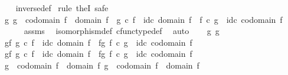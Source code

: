 \begin{isabellebody}
%
\isadelimproof
\ \ %
\endisadelimproof
%
\isatagproof
{}\isamarkupfalse%
\ inverse{\isacharunderscore}{\kern0pt}def\isanewline
{}\isamarkupfalse%
\ {\isacharparenleft}{\kern0pt}rule\ theI{\isacharprime}{\kern0pt}{\isacharcomma}{\kern0pt}\ safe{\isacharparenright}{\kern0pt}\isanewline
\ \ \isamarkupfalse%
\ {\isachardoublequoteopen}{\isasymexists}g{\isachardot}{\kern0pt}\ g\ {\isacharcolon}{\kern0pt}\ codomain\ f\ {\isasymrightarrow}\ domain\ f\ {\isasymand}\ g\ {\isasymcirc}\isactrlsub c\ f\ {\isacharequal}{\kern0pt}\ id\isactrlsub c\ {\isacharparenleft}{\kern0pt}domain\ f{\isacharparenright}{\kern0pt}\ {\isasymand}\ f\ {\isasymcirc}\isactrlsub c\ g\ {\isacharequal}{\kern0pt}\ id\isactrlsub c\ {\isacharparenleft}{\kern0pt}codomain\ f{\isacharparenright}{\kern0pt}{\isachardoublequoteclose}\isanewline
\ \ \ \ \isamarkupfalse%
\ assms\ \isamarkupfalse%
\ isomorphism{\isacharunderscore}{\kern0pt}def\ cfunc{\isacharunderscore}{\kern0pt}type{\isacharunderscore}{\kern0pt}def\ \isamarkupfalse%
\ auto\isanewline
{}\isamarkupfalse%
\isanewline
\ \ \isamarkupfalse%
\ g{}\ g{}\isanewline
\ \ \isamarkupfalse%
\ g{}{\isacharunderscore}{\kern0pt}f{\isacharcolon}{\kern0pt}\ {\isachardoublequoteopen}g{}\ {\isasymcirc}\isactrlsub c\ f\ {\isacharequal}{\kern0pt}\ id\isactrlsub c\ {\isacharparenleft}{\kern0pt}domain\ f{\isacharparenright}{\kern0pt}{\isachardoublequoteclose}\ \ f{\isacharunderscore}{\kern0pt}g{}{\isacharcolon}{\kern0pt}\ {\isachardoublequoteopen}f\ {\isasymcirc}\isactrlsub c\ g{}\ {\isacharequal}{\kern0pt}\ id\isactrlsub c\ {\isacharparenleft}{\kern0pt}codomain\ f{\isacharparenright}{\kern0pt}{\isachardoublequoteclose}\isanewline
\ \ \isamarkupfalse%
\ g{}{\isacharunderscore}{\kern0pt}f{\isacharcolon}{\kern0pt}\ {\isachardoublequoteopen}g{}\ {\isasymcirc}\isactrlsub c\ f\ {\isacharequal}{\kern0pt}\ id\isactrlsub c\ {\isacharparenleft}{\kern0pt}domain\ f{\isacharparenright}{\kern0pt}{\isachardoublequoteclose}\ \ f{\isacharunderscore}{\kern0pt}g{}{\isacharcolon}{\kern0pt}\ {\isachardoublequoteopen}f\ {\isasymcirc}\isactrlsub c\ g{}\ {\isacharequal}{\kern0pt}\ id\isactrlsub c\ {\isacharparenleft}{\kern0pt}codomain\ f{\isacharparenright}{\kern0pt}{\isachardoublequoteclose}\isanewline
\ \ \isamarkupfalse%
\ {\isachardoublequoteopen}g{}\ {\isacharcolon}{\kern0pt}\ codomain\ f\ {\isasymrightarrow}\ domain\ f{\isachardoublequoteclose}\ {\isachardoublequoteopen}g{}\ {\isacharcolon}{\kern0pt}\ codomain\ f\ {\isasymrightarrow}\ domain\ f{\isachardoublequoteclose}\isanewline

\end{isabellebody}

